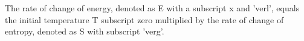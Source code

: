 The rate of change of energy, denoted as E with a subscript x and 'verl', equals the initial temperature T subscript zero multiplied by the rate of change of entropy, denoted as S with subscript 'verg'.